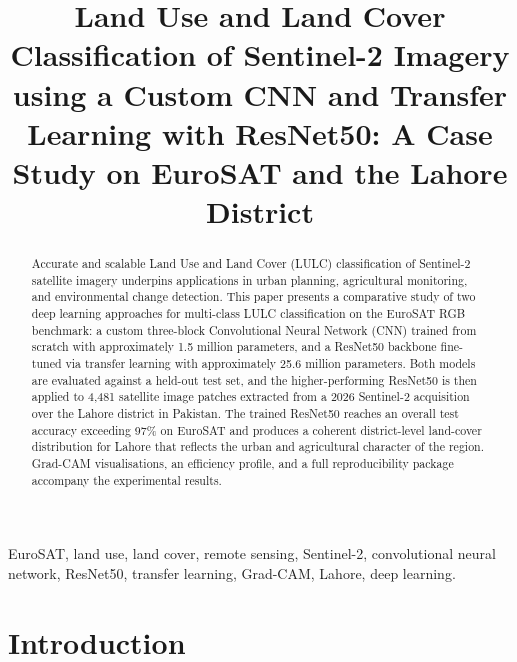 \documentclass[conference]{IEEEtran}
\begin{document}
\title{Land Use and Land Cover Classification of Sentinel-2 Imagery
using a Custom CNN and Transfer Learning with ResNet50:
A Case Study on EuroSAT and the Lahore District}

\author{
}

\maketitle

\begin{abstract}
Accurate and scalable Land Use and Land Cover (LULC) classification of
Sentinel-2 satellite imagery underpins applications in urban planning,
agricultural monitoring, and environmental change detection.
This paper presents a comparative study of two deep learning
approaches for multi-class LULC classification on the EuroSAT RGB
benchmark: a custom three-block Convolutional Neural Network (CNN)
trained from scratch with approximately 1.5 million parameters, and a
ResNet50 backbone fine-tuned via transfer learning with approximately
25.6 million parameters. Both models are evaluated against a held-out
test set, and the higher-performing ResNet50 is then applied to
4{,}481 satellite image patches extracted from a 2026 Sentinel-2
acquisition over the Lahore district in Pakistan. The trained ResNet50
reaches an overall test accuracy exceeding 97\% on EuroSAT and produces
a coherent district-level land-cover distribution for Lahore that
reflects the urban and agricultural character of the region.
Grad-CAM visualisations, an efficiency profile, and a full
reproducibility package accompany the experimental results.
\end{abstract}

\begin{IEEEkeywords}
EuroSAT, land use, land cover, remote sensing, Sentinel-2,
convolutional neural network, ResNet50, transfer learning,
Grad-CAM, Lahore, deep learning.
\end{IEEEkeywords}

\section{Introduction}
\label{sec:intro}
\end{document}

